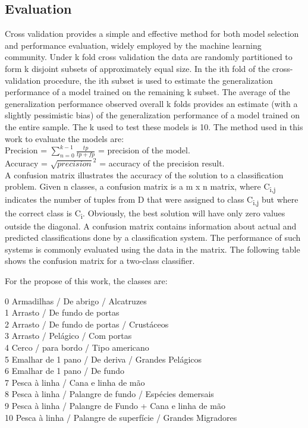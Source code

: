 \subsection{Evaluation} %
\label{sub:evaluation}
Cross \textendash validation \cite{CrossValidatory} provides a simple and effective method for both model selection and performance evaluation, widely employed by the machine learning community. Under k \textendash fold cross \textendash validation the data are randomly partitioned to form k disjoint subsets of approximately equal size. In the ith fold of the cross-validation procedure, the ith subset is used to estimate the generalization performance of a model trained on the remaining k  subset. The average of the generalization performance observed overall k folds provides an estimate (with a slightly pessimistic bias) of the generalization performance of a model trained on the entire sample.
The k used to test these models is 10.
The method used in this work to evaluate the models are:\\
Precision = \(\sum_{n=0}^{k-1}\frac{tp}{tp+fp} \)  = precision of the model.\\
Accuracy = \( \sqrt{precision} ^ 2\) = accuracy of the precision result.\\


A confusion matrix \cite{CMPatil} illustrates the accuracy of the solution to a classification problem. Given n classes, a confusion matrix is a m x n matrix, where C\textsubscript{i,j} indicates the number of tuples from D that were assigned to class C\textsubscript{i,j} but where the correct class is C\textsubscript{i}.
Obviously, the best solution will have only zero values outside the diagonal.
A confusion matrix contains information about actual and predicted classifications done by a classification system. The performance of such systems is commonly evaluated using the data in the matrix. The following table shows the confusion matrix for a two-class classifier. 

For the propose of this work, the classes are: 

0    Armadilhas / De abrigo / Alcatruzes \\
1    Arrasto / De fundo de portas \\
2    Arrasto / De fundo de portas / Crustáceos\\
3    Arrasto / Pelágico / Com portas\\
4    Cerco / para bordo / Tipo americano\\
5    Emalhar de 1 pano / De deriva / Grandes Pelágicos\\
6    Emalhar de 1 pano / De fundo\\
7    Pesca à linha / Cana e linha de mão\\
8    Pesca à linha / Palangre de fundo / Espécies demersais\\
9    Pesca à linha / Palangre de Fundo + Cana e linha de mão\\
10    Pesca à linha / Palangre de superfície / Grandes Migradores



